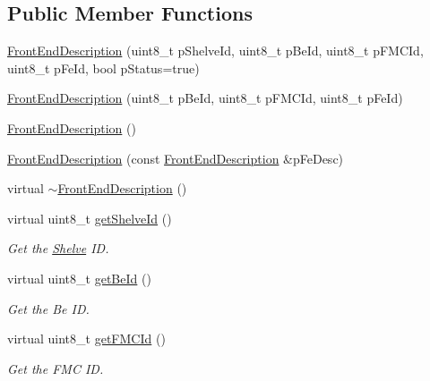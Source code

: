 \subsection*{Public Member Functions}
\begin{DoxyCompactItemize}
\item 
\hyperlink{class_ph2___hw_description_1_1_front_end_description_a9605f28b75ce29cba767fe6efb9d9d19}{Front\-End\-Description} (uint8\-\_\-t p\-Shelve\-Id, uint8\-\_\-t p\-Be\-Id, uint8\-\_\-t p\-F\-M\-C\-Id, uint8\-\_\-t p\-Fe\-Id, bool p\-Status=true)
\item 
\hyperlink{class_ph2___hw_description_1_1_front_end_description_a38c5f465c7227c8cf3f897ab88f9598c}{Front\-End\-Description} (uint8\-\_\-t p\-Be\-Id, uint8\-\_\-t p\-F\-M\-C\-Id, uint8\-\_\-t p\-Fe\-Id)
\item 
\hyperlink{class_ph2___hw_description_1_1_front_end_description_a3fc1d338b2fb7eca2c8b0038ed235daf}{Front\-End\-Description} ()
\item 
\hyperlink{class_ph2___hw_description_1_1_front_end_description_ada01bf978797bf26295f1947b6896efa}{Front\-End\-Description} (const \hyperlink{class_ph2___hw_description_1_1_front_end_description}{Front\-End\-Description} \&p\-Fe\-Desc)
\item 
virtual \hyperlink{class_ph2___hw_description_1_1_front_end_description_a8ff5e1dc9dc09e6db9c105a362000e89}{$\sim$\-Front\-End\-Description} ()
\item 
virtual uint8\-\_\-t \hyperlink{class_ph2___hw_description_1_1_front_end_description_a2599816f65ecea30824cd3d8fe1fcadc}{get\-Shelve\-Id} ()
\begin{DoxyCompactList}\small\item\em Get the \hyperlink{class_ph2___hw_description_1_1_shelve}{Shelve} I\-D. \end{DoxyCompactList}\item 
virtual uint8\-\_\-t \hyperlink{class_ph2___hw_description_1_1_front_end_description_ae2d759253890ec653dbe1b5c3141887a}{get\-Be\-Id} ()
\begin{DoxyCompactList}\small\item\em Get the Be I\-D. \end{DoxyCompactList}\item 
virtual uint8\-\_\-t \hyperlink{class_ph2___hw_description_1_1_front_end_description_a98bb84a56f109729213ea764739d7e57}{get\-F\-M\-C\-Id} ()
\begin{DoxyCompactList}\small\item\em Get the F\-M\-C I\-D. \end{DoxyCompactList}\item 

\end{DoxyCompactItemize}
